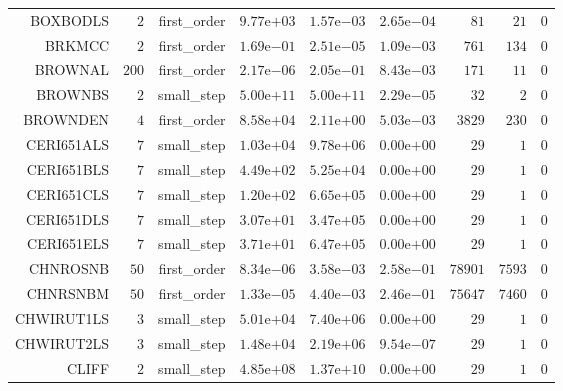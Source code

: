 \begin{longtable}{rrrrrrrrr}
BOXBODLS & \(     2\) & first\_order & \( 9.77\)e\(+03\) & \( 1.57\)e\(-03\) & \( 2.65\)e\(-04\) & \(    81\) & \(    21\) & \(     0\) \\
BRKMCC & \(     2\) & first\_order & \( 1.69\)e\(-01\) & \( 2.51\)e\(-05\) & \( 1.09\)e\(-03\) & \(   761\) & \(   134\) & \(     0\) \\
BROWNAL & \(   200\) & first\_order & \( 2.17\)e\(-06\) & \( 2.05\)e\(-01\) & \( 8.43\)e\(-03\) & \(   171\) & \(    11\) & \(     0\) \\
BROWNBS & \(     2\) & small\_step & \( 5.00\)e\(+11\) & \( 5.00\)e\(+11\) & \( 2.29\)e\(-05\) & \(    32\) & \(     2\) & \(     0\) \\
BROWNDEN & \(     4\) & first\_order & \( 8.58\)e\(+04\) & \( 2.11\)e\(+00\) & \( 5.03\)e\(-03\) & \(  3829\) & \(   230\) & \(     0\) \\
CERI651ALS & \(     7\) & small\_step & \( 1.03\)e\(+04\) & \( 9.78\)e\(+06\) & \( 0.00\)e\(+00\) & \(    29\) & \(     1\) & \(     0\) \\
CERI651BLS & \(     7\) & small\_step & \( 4.49\)e\(+02\) & \( 5.25\)e\(+04\) & \( 0.00\)e\(+00\) & \(    29\) & \(     1\) & \(     0\) \\
CERI651CLS & \(     7\) & small\_step & \( 1.20\)e\(+02\) & \( 6.65\)e\(+05\) & \( 0.00\)e\(+00\) & \(    29\) & \(     1\) & \(     0\) \\
CERI651DLS & \(     7\) & small\_step & \( 3.07\)e\(+01\) & \( 3.47\)e\(+05\) & \( 0.00\)e\(+00\) & \(    29\) & \(     1\) & \(     0\) \\
CERI651ELS & \(     7\) & small\_step & \( 3.71\)e\(+01\) & \( 6.47\)e\(+05\) & \( 0.00\)e\(+00\) & \(    29\) & \(     1\) & \(     0\) \\
CHNROSNB & \(    50\) & first\_order & \( 8.34\)e\(-06\) & \( 3.58\)e\(-03\) & \( 2.58\)e\(-01\) & \( 78901\) & \(  7593\) & \(     0\) \\
CHNRSNBM & \(    50\) & first\_order & \( 1.33\)e\(-05\) & \( 4.40\)e\(-03\) & \( 2.46\)e\(-01\) & \( 75647\) & \(  7460\) & \(     0\) \\
CHWIRUT1LS & \(     3\) & small\_step & \( 5.01\)e\(+04\) & \( 7.40\)e\(+06\) & \( 0.00\)e\(+00\) & \(    29\) & \(     1\) & \(     0\) \\
CHWIRUT2LS & \(     3\) & small\_step & \( 1.48\)e\(+04\) & \( 2.19\)e\(+06\) & \( 9.54\)e\(-07\) & \(    29\) & \(     1\) & \(     0\) \\
CLIFF & \(     2\) & small\_step & \( 4.85\)e\(+08\) & \( 1.37\)e\(+10\) & \( 0.00\)e\(+00\) & \(    29\) & \(     1\) & \(     0\) \\

\end{longtable}
